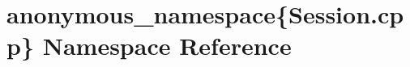 \hypertarget{namespaceanonymous__namespace_02Session_8cpp_03}{}\section{anonymous\+\_\+namespace\{Session.\+cpp\} Namespace Reference}
\label{namespaceanonymous__namespace_02Session_8cpp_03}
